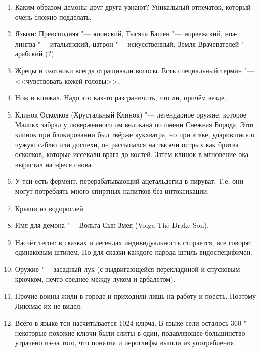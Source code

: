 \begin{enumerate}
\item Каким образом демоны друг друга узнают?
Уникальный отпечаток, который очень сложно подделать.

\item Языки: Преисподняя "--- японский, Тысяча Башен "--- норвежский, ноа-лингва "--- итальянский, цатрон "--- искусственный, Земля Врачевателей "--- арабский (?).

\item Жрецы и охотники всегда отращивали волосы.
Есть специальный термин "--- <<чувствовать кожей головы>>.

\item Нож и кинжал.
Надо это как-то разграничить, что ли, причём везде.

\item Клинок Осколков (Хрустальный Клинок) "--- легендарное оружие, которое Маликх забрал у поверженного им великана по имени Снежная Борода.
Этот клинок при блокировании был твёрже кукхватра, но при атаке, ударившись о чужую саблю или доспехи, он рассыпался на тысячи острых как бритва осколков, которые иссекали врага до костей.
Затем клинок в мгновение ока вырастал на эфесе снова.

\item У тси есть фермент, перерабатывающий ацетальдегид в пируват.
Т.е. они могут потреблять много спиртных напитков без интоксикации.

\item Крыши из водорослей.

\item Имя для демона "--- Вольга Сын Змея (Volga The Drake Son).

\item Насчёт тегов: в сказках и легендах индивидуальность стирается, все говорят одинаковым штилем.
Но для сказки каждого народа штиль видоспецифичен.

\item Оружие "--- засадный лук (с выдвигающейся перекладиной и спусковым крючком, нечто среднее между луком и арбалетом).

\item Прочие воины жили в городе и приходили лишь на работу и поесть.
Поэтому Ликхмас их не видел.

\item Всего в языке тси насчитывается 1024 ключа.
В языке сели осталось 360 "--- некоторые похожие ключи были слиты в один, подавляющее большинство утрачено из-за того, что понятия и иероглифы вышли из употребления.


\end{enumerate}

